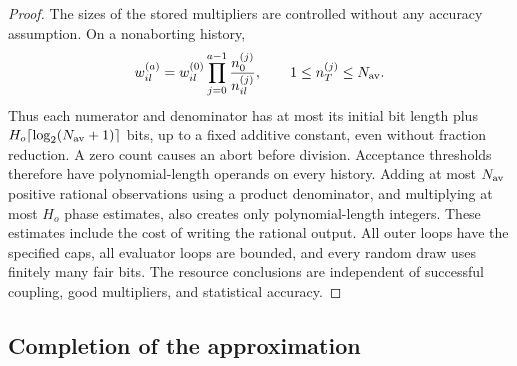 \begin{proof}
The sizes of the stored multipliers are controlled without any accuracy
assumption.  On a nonaborting history,
\[
 w_{il}^{(a)}=w_{il}^{(0)}
       \prod_{j=0}^{a-1}\frac{n_0^{(j)}}{n_{il}^{(j)}},
 \qquad1\leq n_T^{(j)}\leq N_{\rm av}.
\]
Thus each numerator and denominator has at most its initial bit length
plus $H_o\lceil\log_2(N_{\rm av}+1)\rceil$ bits, up to a fixed
additive constant, even without fraction reduction.  A zero count
causes an abort before division.  Acceptance thresholds therefore
have polynomial-length operands on every history.  Adding at most
$N_{\rm av}$ positive rational observations using a product denominator,
and multiplying at most $H_o$ phase estimates, also creates only
polynomial-length integers.  These estimates include the cost of
writing the rational output.  All outer loops have the specified caps,
all evaluator loops are bounded, and every random draw uses finitely
many fair bits.  The resource conclusions are independent of successful
coupling, good multipliers, and statistical accuracy.
\end{proof}

\subsection{Completion of the approximation}


